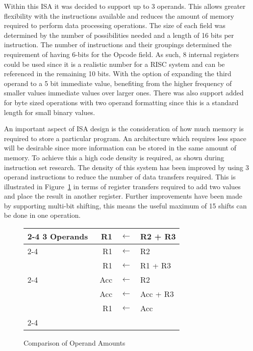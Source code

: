 Within this ISA it was decided to support up to 3 operands. 
This allows greater flexibility with the instructions available and reduces the amount of memory required to perform data processing operations. 
The size of each field was determined by the number of possibilities needed and a length of 16 bits per instruction.
The number of instructions and their groupings determined the requirement of having 6-bits for the Opcode field. 
As such, 8 internal registers could be used since it is a realistic number for a RISC system and can be referenced in the remaining 10 bits. 
With the option of expanding the third operand to a 5 bit immediate value, benefiting from the higher frequency of smaller values immediate values over larger ones. 
There was also support added for byte sized operations with two operand formatting since this is a standard length for small binary values. 

An important aspect of ISA design is the consideration of how much memory is required to store a particular program. 
An architecture which requires less space will be desirable since more information can be stored in the same amount of memory. 
To achieve this a high code density is required, as shown during instruction set research.
The density of this system has been improved by using 3 operand instructions to reduce the number of data transfers required. 
This is illustrated in Figure~\ref{fig:NoOperands} in terms of register transfers required to add two values and place the result in another register. 
Further improvements have been made by supporting multi-bit shifting, this means the useful maximum of 15 shifts can be done in one operation.

\begin{figure}[h]
\setlength{\tabcolsep}{2pt}
\centering
\footnotesize
\begin{tabular}{l|rcl|}
	\cline{2-4}
	3 Operands & R1 & $\leftarrow$ & R2 + R3 \\
	\cline{2-4}
	\multirow{2}{*}{2 Operands} & R1 & $\leftarrow$ & R2 \\
	 & R1 & $\leftarrow$ & R1 + R3 \\
	\cline{2-4}
	\multirow{3}{*}{1 Operand} & Acc & $\leftarrow$ & R2 \\
	 & ~Acc & $\leftarrow$ & Acc + R3 \hspace{0.5cm} \\
	 & R1 & $\leftarrow$ & Acc \\
	\cline{2-4}
\end{tabular}
\caption{Comparison of Operand Amounts}
\label{fig:NoOperands}
\end{figure}

